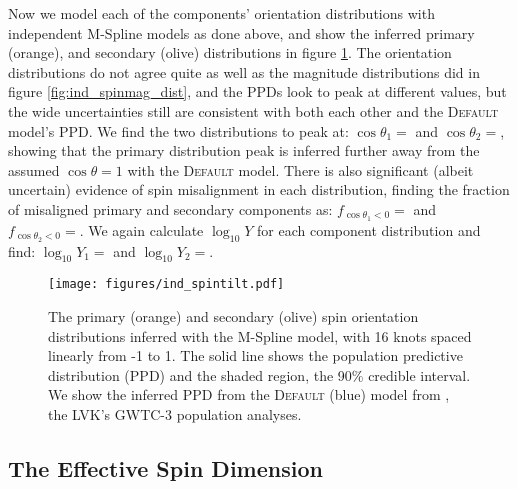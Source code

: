 Now we model each of the components' orientation distributions with independent M-Spline models as done above, and show the inferred 
primary (orange), and secondary (olive) distributions in figure \ref{fig:ind_spintilt_dist}. The orientation distributions do not agree quite as well as 
the magnitude distributions did in figure \ref{fig:ind_spinmag_dist}, and the PPDs look to peak at different values, but the wide uncertainties still are 
consistent with both each other and the \textsc{Default} model's PPD. We find the two distributions to peak at: $\cos{\theta_1}=$\result{$\CIPlusMinus{\macros[MSplineIndependentCompSpins][peakCosTilt1]}$} 
and $\cos{\theta_2}=$\result{$\CIPlusMinus{\macros[MSplineIndependentCompSpins][peakCosTilt2]}$}, showing that the primary distribution peak is inferred further away 
from the assumed $\cos{\theta}=1$ with the \textsc{Default} model. There is also significant (albeit uncertain) evidence of spin misalignment in each distribution, finding 
the fraction of misaligned primary and secondary components as: $f_{\cos{\theta_1}<0}=$\result{$\CIPlusMinus{\macros[MSplineIndependentCompSpins][negFrac1]}$} and 
$f_{\cos{\theta_2}<0}=$\result{$\CIPlusMinus{\macros[MSplineIndependentCompSpins][negFrac2]}$}. We again calculate $\log_{10}Y$  
for each component distribution and find: $\log_{10}Y_1=$ and 
$\log_{10}Y_2=$.

\begin{figure}
    \begin{centering}
        \texttt{[image: figures/ind\_spintilt.pdf]}
        \caption{The primary (orange) and secondary (olive) spin orientation distributions inferred with the M-Spline model, 
        with 16 knots spaced linearly from -1 to 1. The solid line shows the population predictive distribution (PPD) and the shaded region, the 90\% credible interval. 
        We show the inferred PPD from the \textsc{Default} (blue) model from \citet{o3b_astro_dist}, the LVK's GWTC-3 population analyses.}
        \label{fig:ind_spintilt_dist}
    \end{centering}
\end{figure}

\subsection{The Effective Spin Dimension}

